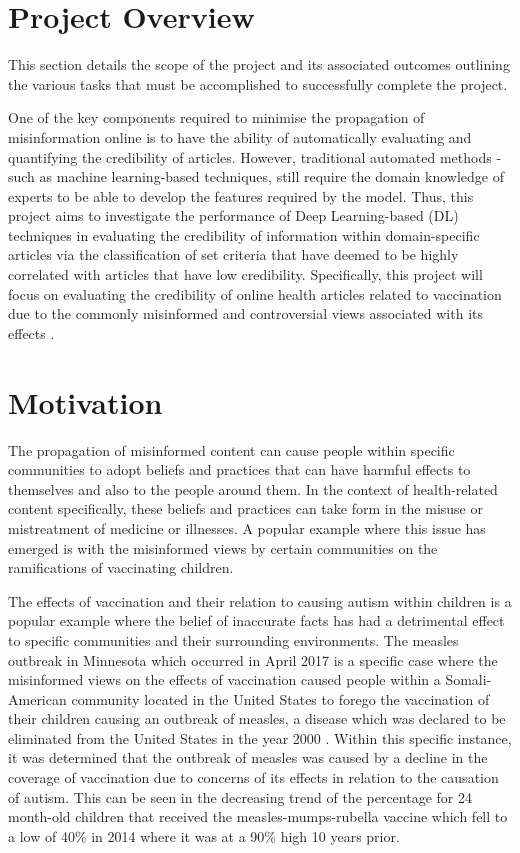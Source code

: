 \documentclass[a4paper,twoside,phd]{BYUPhys}
\begin{document}
\section{Project Overview}
\label{sec:ProjectOverview}
This section details the scope of the project and its associated outcomes outlining the various tasks that must be accomplished to successfully complete the project.

One of the key components required to minimise the propagation of misinformation online is to have the ability of automatically evaluating and quantifying the credibility of articles. However, traditional automated methods - such as machine learning-based techniques, still require the domain knowledge of experts to be able to develop the features required by the model. Thus, this project aims to investigate the performance of Deep Learning-based (DL) techniques in evaluating the credibility of information within domain-specific articles via the classification of set criteria that have deemed to be highly correlated with articles that have low credibility. Specifically, this project will focus on evaluating the credibility of online health articles related to vaccination due to the commonly misinformed and controversial views associated with its effects \cite{Burgess2006}. \newline

\section{Motivation}
\label{sec:Motivation}
The propagation of misinformed content can cause people within specific communities to adopt beliefs and practices that can have harmful effects to themselves and also to the people around them. In the context of health-related content specifically, these beliefs and practices can take form in the misuse or mistreatment of medicine or illnesses. A popular example where this issue has emerged is with the misinformed views by certain communities on the ramifications of vaccinating children. \newline

The effects of vaccination and their relation to causing autism within children is a popular example where the belief of inaccurate facts has had a detrimental effect to specific communities and their surrounding environments. The measles outbreak in Minnesota which occurred in April 2017 is a specific case where the misinformed views on the effects of vaccination caused people within a Somali-American community located in the United States to forego the vaccination of their children causing an outbreak of measles, a disease which was declared to be eliminated from the United States in the year 2000 \cite{Hall2017}. Within this specific instance, it was determined that the outbreak of measles was caused by a decline in the coverage of vaccination due to concerns of its effects in relation to the causation of autism. This can be seen in the decreasing trend of the percentage for 24 month-old children that received the measles-mumps-rubella vaccine which fell to a low of 40\% in 2014 where it was at a 90\% high 10 years prior.
\end{document}
